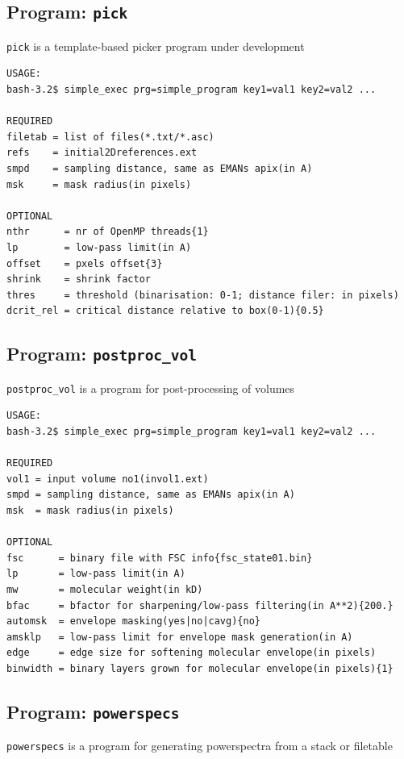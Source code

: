 \documentclass[a4paper,11pt]{article}
\newcommand{\prgname}[1]{\textcolor{NavyBlue}{\texttt{#1}}}
\begin{document}
\subsection{Program: \prgname{pick}}
\label{pick}
\prgname{pick} is a template-based picker program under development

\begin{verbatim}
USAGE:
bash-3.2$ simple_exec prg=simple_program key1=val1 key2=val2 ...

REQUIRED
filetab = list of files(*.txt/*.asc)
refs    = initial2Dreferences.ext
smpd    = sampling distance, same as EMANs apix(in A)
msk     = mask radius(in pixels)

OPTIONAL
nthr      = nr of OpenMP threads{1}
lp        = low-pass limit(in A)
offset    = pxels offset{3}
shrink    = shrink factor
thres     = threshold (binarisation: 0-1; distance filer: in pixels)
dcrit_rel = critical distance relative to box(0-1){0.5}
\end{verbatim}

\subsection{Program: \prgname{postproc\_vol}}
\label{postproc_vol}
\prgname{postproc\_vol} is a program for post-processing of volumes

\begin{verbatim}
USAGE:
bash-3.2$ simple_exec prg=simple_program key1=val1 key2=val2 ...

REQUIRED
vol1 = input volume no1(invol1.ext)
smpd = sampling distance, same as EMANs apix(in A)
msk  = mask radius(in pixels)

OPTIONAL
fsc      = binary file with FSC info{fsc_state01.bin}
lp       = low-pass limit(in A)
mw       = molecular weight(in kD)
bfac     = bfactor for sharpening/low-pass filtering(in A**2){200.}
automsk  = envelope masking(yes|no|cavg){no}
amsklp   = low-pass limit for envelope mask generation(in A)
edge     = edge size for softening molecular envelope(in pixels)
binwidth = binary layers grown for molecular envelope(in pixels){1}
\end{verbatim}

\subsection{Program: \prgname{powerspecs}}
\label{powerspecs}
\prgname{powerspecs} is a program for generating powerspectra from a stack or filetable
\end{document}
